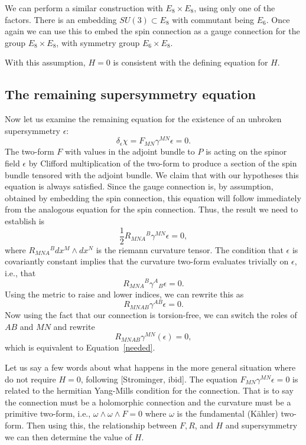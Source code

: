 We can perform a similar construction with $E_8\times E_8$, using only
one of the factors.  There is an embedding $SU(3)\subset E_8$ with
commutant being $E_6$.
Once again we can use this to embed the spin connection as a gauge
connection for the group $E_8\times E_8$, with symmetry group
$E_6\times E_8$. 



\smallskip
{}

With this assumption, $H=0$ is consistent with the defining equation
for $H$.  

\subsection{The remaining supersymmetry equation}

Now let us examine the remaining equation for the existence of an
unbroken supersymmetry $\epsilon$:
$$\delta_\epsilon \chi =F_{MN}\gamma^{MN}\epsilon=0.$$
The two-form $F$ with values in the adjoint bundle to $P$ is acting on
the spinor field $\epsilon$ by Clifford multiplication of the two-form
to produce a section of the spin bundle tensored with the adjoint
bundle. 
We claim that with our hypotheses this equation is always satisfied. 
Since the gauge connection is, by assumption, obtained by embedding
the spin connection, this equation will follow immediately from the
analogous equation for the spin connection.
Thus, the result we need to establish is
\begin{equation}\label{needed}
\frac{1}{2}R_{MNA}{}^B\gamma^{MN}\epsilon =0,
\end{equation}
where $R_{MNA}{}^Bdx^M\wedge dx^N$ is the riemann curvature tensor.
The condition that $\epsilon$ is covariantly constant implies that the
curvature two-form evaluates trivially on $\epsilon$, i.e., that
$$R_{MNA}{}^B\gamma^A{}_B\epsilon=0.$$
Using the metric to raise and lower indices, we can rewrite this as
$$R_{MNAB}\gamma^{AB}\epsilon=0.$$
Now using the fact that our connection is torsion-free, we can switch
the roles of $AB$ and $MN$ and rewrite
$$R_{MNAB}\gamma^{MN}(\epsilon)=0,$$
which is equivalent to Equation~\ref{needed}.


Let us say a few words about what happens in the more general
situation where do not require $H=0$, following [Strominger, ibid].
The equation $F_{MN}\gamma^{MN}\epsilon=0$ is related to
the hermitian Yang-Mills condition for the connection. That is to say
the connection must be a holomorphic connection and the curvature must
be a primitive two-form, i.e., $\omega\wedge\omega\wedge F=0$ where
$\omega$ is the fundamental (K\"ahler) two-form. 
Then using this, the relationship between $F,R$, and $H$ and
supersymmetry we can then determine the value of $H$.


